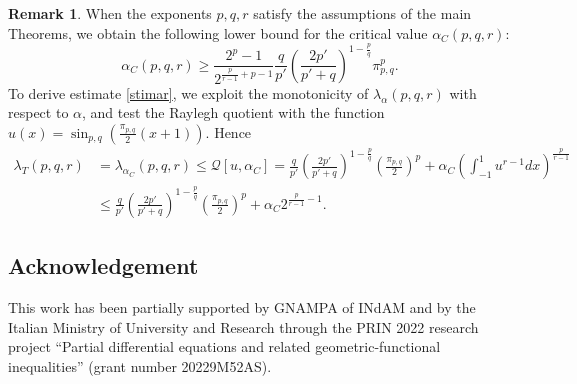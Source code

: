 \documentclass{amsart}
\theoremstyle{definition}
\newtheorem{rem}[thm]{Remark}
\theoremstyle{remark}
\begin{document}
\begin{rem}
When the exponents $p,q,r$ satisfy the assumptions of the main Theorems, we obtain the following lower bound for the critical value $\alpha_C(p,q,r)$:
	\begin{equation}
	\label{stimar}
	\alpha_{C}(p,q,r)\ge \frac{2^p-1}{2^{\frac p{r-1}+p-1}}\frac {q}{p'}\left(\frac {2p'} {p'+q}\right)^{1-\frac pq} \pi_{p,q}^p.
	\end{equation}
To derive estimate \eqref{stimar}, we exploit the monotonicity of $\lambda_{\alpha}(p,q,r)$ with respect to $\alpha$, and test the Raylegh quotient with the function $u(x)=\sin_{p,q}(\frac{\pi_{p,q}}{2} (x+1))$. Hence
	\begin{equation*}
	\begin{split}
\lambda_T(p,q,r)&=\lambda_{\alpha_{C}}(p,q,r)\le\mathcal{Q}[u,\alpha_{C}]=\frac {q}{p'}\left(\frac {2p'} {p'+q}\right)^{1-\frac pq} \left(\frac{\pi_{p,q}}{2}\right)^p+\alpha_{C}\left(\int_{-1}^{1}u^{r-1}dx\right)^{\frac p{r-1}}\\
& \le \frac {q}{p'}\left(\frac {2p'} {p'+q}\right)^{1-\frac pq} \left(\frac{\pi_{p,q}}{2}\right)^p +\alpha_{C}2^{\frac p{r-1}-1}.
	\end{split}
	\end{equation*}
\end{rem}

\subsection*{Acknowledgement} 
This work has been partially supported by GNAMPA of INdAM and by the Italian Ministry of University and Research through the PRIN 2022 research project ``Partial differential equations and related geometric-functional inequalities'' (grant number 20229M52AS).
\end{document}
